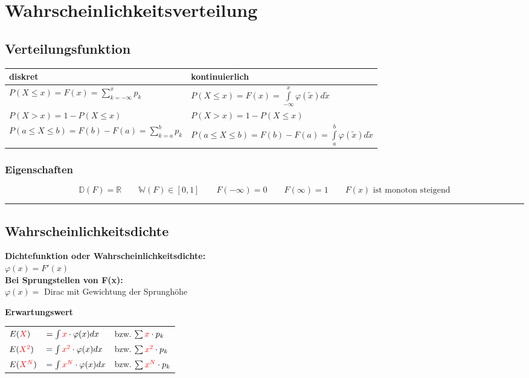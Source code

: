 \section{Wahrscheinlichkeitsverteilung}

	\subsection{Verteilungsfunktion }
		\begin{tabular}[]{|l|l|}
        	\hline
        	\textbf{diskret} & \textbf{kontinuierlich}\\
        	\hline
        	\hline
        	$P(X\leq x)=F(x)=\sum\limits_{k=-\infty}^x p_k$ &
        	$P(X\leq x)=F(x)=\int\limits_{-\infty}^x
        	\varphi(\tilde{x})d\tilde{x}$\\
  			$P(X>x)=1-P(X\leq x)$ & $P(X>x)=1-P(X\leq x)$\\        	
        	$P(a \le X \leq b)=F(b)-F(a)=\sum\limits_{k=a}^b p_k$ &
  			$P(a \le X \leq b)=F(b)-F(a)=\int \limits_a^b
  			\varphi(\tilde{x})d\tilde{x}$\\
        	\hline
        \end{tabular}

		\subsubsection{Eigenschaften}
  				$$\boxed{\mathbb{D}(F) = \mathbb{R}} \qquad \boxed{\mathbb{W}(F)
  				\in[0,1]} \qquad \boxed{F(-\infty)=0} \qquad  \boxed{F(\infty)=1}
  				\qquad \boxed{F(x) \text{ ist monoton steigend}}$$

\hrule

\subsection{Wahrscheinlichkeitsdichte}
\begin{multicols}{2}
\textbf{Dichtefunktion oder Wahrscheinlichkeitsdichte:} \\
$\varphi(x) = F'(x)$ \\
\textbf{Bei Sprungstellen von F(x):} \\
$\varphi(x) = $ Dirac mit Gewichtung der Sprunghöhe

\columnbreak

	\textbf{Erwartungswert} \\
	\begin{tabular}{l l l}
		$E(\textcolor{red}{X})$ & $ = \int \textcolor{red}{x} \cdot \varphi(x) dx$  & bzw. $\sum \textcolor{red}{x} \cdot p_k$\\
		$E(\textcolor{red}{X^2})$ & $ = \int \textcolor{red}{x^2} \cdot \varphi(x) dx$ & bzw. $\sum \textcolor{red}{x^2} \cdot p_k$\\
		$E(\textcolor{red}{X^N})$ & $ = \int \textcolor{red}{x^N} \cdot \varphi(x) dx$ & bzw. $\sum \textcolor{red}{x^N} \cdot p_k$
	\end{tabular}
\end{multicols}

